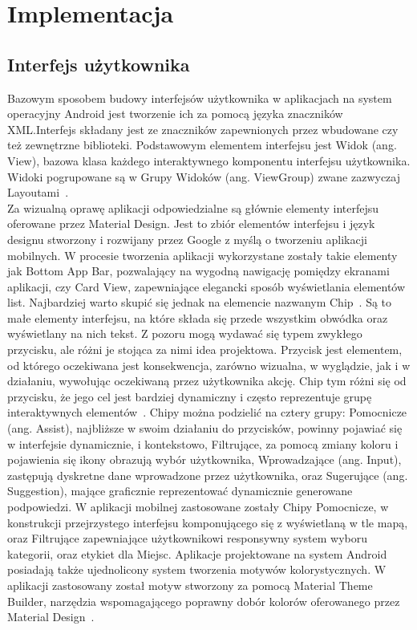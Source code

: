\newpage
\section{Implementacja}
\vspace{1cm}
    \subsection{Interfejs użytkownika}\label{interface}
    Bazowym sposobem budowy interfejsów użytkownika w aplikacjach na system operacyjny Android jest tworzenie ich za pomocą języka znaczników XML.\@ Interfejs składany jest ze znaczników zapewnionych przez
    wbudowane czy też zewnętrzne biblioteki. Podstawowym elementem interfejsu jest Widok (ang. View), bazowa klasa każdego interaktywnego komponentu interfejsu użytkownika. Widoki pogrupowane są w Grupy 
    Widoków (ang. ViewGroup) zwane zazwyczaj Layoutami~\cite{VIEW}. \\

    Za wizualną oprawę aplikacji odpowiedzialne są głównie elementy interfejsu oferowane przez Material Design. Jest to zbiór elementów interfejsu i język designu stworzony i rozwijany przez Google 
    z myślą o tworzeniu aplikacji mobilnych. W procesie tworzenia aplikacji wykorzystane zostały takie elementy jak Bottom App Bar, pozwalający na wygodną nawigację pomiędzy ekranami aplikacji, czy
    Card View, zapewniające elegancki sposób wyświetlania elementów list. Najbardziej warto skupić się jednak na elemencie nazwanym Chip~\cite{CHIPS}. Są to małe elementy interfejsu, na które składa  
    się przede wszystkim obwódka oraz wyświetlany na nich tekst. Z pozoru mogą wydawać się typem zwykłego przycisku, ale różni je stojąca za nimi idea projektowa. Przycisk jest elementem, od którego 
    oczekiwana jest konsekwencja, zarówno wizualna, w wyglądzie, jak i w działaniu, wywołując oczekiwaną przez użytkownika akcję. Chip tym różni się od przycisku, że jego cel jest bardziej dynamiczny i
    często reprezentuje grupę interaktywnych elementów~\cite{CHIPS_GL}. Chipy można podzielić na cztery grupy: Pomocnicze (ang. Assist), najbliższe w swoim działaniu do przycisków, powinny pojawiać się w
    interfejsie dynamicznie, i kontekstowo, Filtrujące, za pomocą zmiany koloru i pojawienia się ikony obrazują wybór użytkownika, Wprowadzające (ang. Input), zastępują dyskretne dane wprowadzone przez
    użytkownika, oraz Sugerujące (ang. Suggestion), mające graficznie reprezentować dynamicznie generowane podpowiedzi. W aplikacji mobilnej zastosowane zostały Chipy Pomocnicze, w konstrukcji przejrzystego
    interfejsu komponującego się z wyświetlaną w tle mapą, oraz Filtrujące zapewniające użytkownikowi responsywny system wyboru kategorii, oraz etykiet dla Miejsc. Aplikacje projektowane na system Android 
    posiadają także ujednolicony system tworzenia motywów kolorystycznych. W aplikacji zastosowany został motyw stworzony za pomocą Material Theme Builder, narzędzia wspomagającego poprawny dobór 
    kolorów oferowanego przez Material Design~\cite{THEME}.\\

